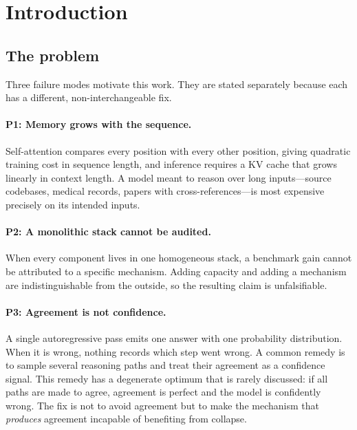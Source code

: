 \documentclass[11pt,a4paper]{article}
\theoremstyle{plain}
\theoremstyle{definition}
\theoremstyle{remark}
\begin{document}
\tableofcontents

\clearpage


\section{Introduction}

\subsection{The problem}

\noindent
Three failure modes motivate this work. They are stated separately because
each has a different, non-interchangeable fix.

\paragraph{P1: Memory grows with the sequence.}
Self-attention compares every position with every other position, giving
quadratic training cost in sequence length, and inference requires a KV cache
that grows linearly in context length. A model meant to reason over long
inputs---source codebases, medical records, papers with cross-references---is
most expensive precisely on its intended inputs.

\paragraph{P2: A monolithic stack cannot be audited.}
When every component lives in one homogeneous stack, a benchmark gain cannot
be attributed to a specific mechanism. Adding capacity and adding a mechanism
are indistinguishable from the outside, so the resulting claim is
unfalsifiable.

\paragraph{P3: Agreement is not confidence.}
A single autoregressive pass emits one answer with one probability
distribution. When it is wrong, nothing records which step went wrong. A
common remedy is to sample several reasoning paths and treat their agreement
as a confidence signal. This remedy has a degenerate optimum that is rarely
discussed: if all paths are made to agree, agreement is perfect and the model
is confidently wrong. The fix is not to avoid agreement but to make the
mechanism that \emph{produces} agreement incapable of benefiting from
collapse.
\end{document}

